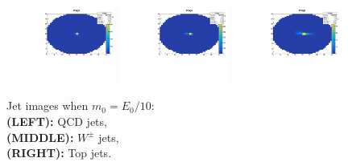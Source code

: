 \begin{figure}
    \begin{center}
        \includegraphics[width=0.32\textwidth]{./1/imageQCD.pdf}
        \includegraphics[width=0.32\textwidth]{./1/imageW.pdf}
        \includegraphics[width=0.32\textwidth]{./1/imageTOP.pdf}
        \caption{
            Jet images when $m_{0}=E_{0}/10$:\\
            {\bf(LEFT):} QCD jets,\\
            {\bf(MIDDLE):} $W^{\pm}$ jets,\\
            {\bf(RIGHT):} Top jets.
        }
        \label{fig:case1}
    \end{center}
\end{figure}

